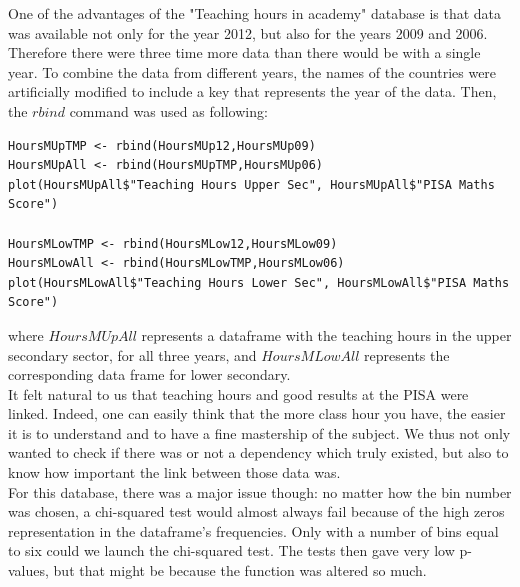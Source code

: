 \documentclass[12pt,a4paper]{article}
\begin{document}
One of the advantages of the "Teaching hours in academy" database is that data was available not only for the year 2012, but also for the years 2009 and 2006. Therefore there were three time more data than there would be with a single year.
To combine the data from different years, the names of the countries were artificially modified to include a key that represents the year of the data. Then, the $rbind$ command was used as following:
\begin{lstlisting}
HoursMUpTMP <- rbind(HoursMUp12,HoursMUp09)
HoursMUpAll <- rbind(HoursMUpTMP,HoursMUp06)
plot(HoursMUpAll$"Teaching Hours Upper Sec", HoursMUpAll$"PISA Maths Score")

HoursMLowTMP <- rbind(HoursMLow12,HoursMLow09)
HoursMLowAll <- rbind(HoursMLowTMP,HoursMLow06)
plot(HoursMLowAll$"Teaching Hours Lower Sec", HoursMLowAll$"PISA Maths Score")
\end{lstlisting}
where $HoursMUpAll$ represents a dataframe with the teaching hours in the upper secondary sector, for all three years, and $HoursMLowAll$ represents the corresponding data frame for lower secondary.
\\
It felt natural to us that teaching hours and good results at the PISA were linked. Indeed, one can easily think that the more class hour you have, the easier it is to understand and to have a fine mastership of the subject. We thus not only wanted to check if there was or not a dependency which truly existed, but also to know how important the link between those data was.
\\
For this database, there was a major issue though: no matter how the bin number was chosen, a chi-squared test would almost always fail because of the high zeros representation in the dataframe's frequencies.
Only with a number of bins equal to six could we launch the chi-squared test. The tests then gave very low p-values, but that might be because the function was altered so much.
\end{document}
